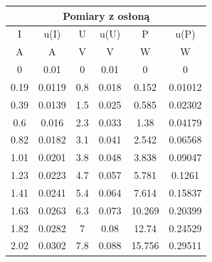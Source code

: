 \begin{center}
    \begin{tabular}{|c|c||c|c||c|c|}
        \hline
        \multicolumn{6}{|c|}{Pomiary z osłoną} \\
        \hline
        I    & u(I)   & U   & u(U)  & P      & u(P)    \\ \hline
        A    & A      & V   & V     & W      & W       \\ \hline
        0    & 0.01   & 0   & 0.01  & 0      & 0       \\ \hline
        0.19 & 0.0119 & 0.8 & 0.018 & 0.152  & 0.01012 \\ \hline
        0.39 & 0.0139 & 1.5 & 0.025 & 0.585  & 0.02302 \\ \hline
        0.6  & 0.016  & 2.3 & 0.033 & 1.38   & 0.04179 \\ \hline
        0.82 & 0.0182 & 3.1 & 0.041 & 2.542  & 0.06568 \\ \hline
        1.01 & 0.0201 & 3.8 & 0.048 & 3.838  & 0.09047 \\ \hline
        1.23 & 0.0223 & 4.7 & 0.057 & 5.781  & 0.1261  \\ \hline
        1.41 & 0.0241 & 5.4 & 0.064 & 7.614  & 0.15837 \\ \hline
        1.63 & 0.0263 & 6.3 & 0.073 & 10.269 & 0.20399 \\ \hline
        1.82 & 0.0282 & 7   & 0.08  & 12.74  & 0.24529 \\ \hline
        2.02 & 0.0302 & 7.8 & 0.088 & 15.756 & 0.29511 \\ \hline
    \end{tabular}
\end{center}

